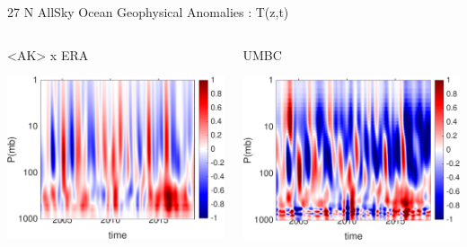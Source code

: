 \documentclass[10pt,t]{beamer}
\begin{document}
\begin{frame}{27 N AllSky Ocean Geophysical Anomalies : T(z,t)}
\begin{columns}
\begin{column}{0.55\columnwidth}
\begin{block}{\footnotesize <AK> x ERA}
\vspace{-0.1in}
\begin{center}
\includegraphics[width=0.95\linewidth]{Figs/CloudAnom/Desc_ocean/ak_x_ntropics27_era_cld_ptemp_anom_200209_201808.png}
\end{center}
\end{block}
\end{column}

\begin{column}{0.55\columnwidth}
\begin{block}{\footnotesize UMBC}
\vspace{-0.1in}
\begin{center}
\includegraphics[width=0.95\linewidth]{Figs/CloudAnom/Desc_ocean/ntropic27N_umbc_cld_retr_obs_ptemp_anom_200209_201808.png}
\end{center}
\end{block}
\end{column}
\end{columns}

\end{frame}
\end{document}
